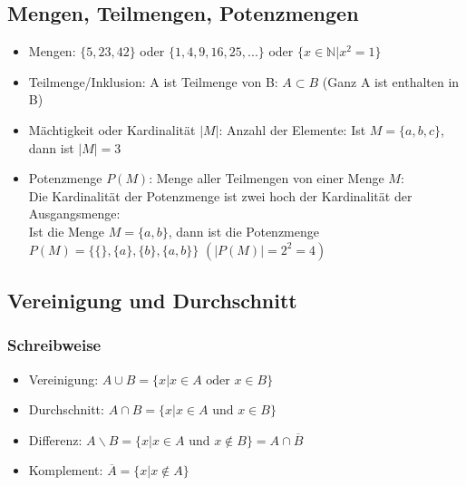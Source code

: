 \subsection{Mengen, Teilmengen, Potenzmengen}
\begin{itemize}
  \item Mengen: $\{5, 23, 42\}$ oder $\{1, 4, 9, 16, 25, ...\}$ oder
  $\{x \in \mathbb{N} | x^2 = 1 \}$
  \item Teilmenge/Inklusion: A ist Teilmenge von B: $A \subset B$ (Ganz A ist enthalten in B)
  \item Mächtigkeit oder Kardinalität $|M|$: Anzahl der Elemente: Ist $M = \{a, b, c\}$, dann ist $|M| = 3$
  \item Potenzmenge $P(M)$: Menge aller Teilmengen von einer Menge $M$:
  \\ Die Kardinalität der Potenzmenge ist zwei hoch der Kardinalität der Ausgangsmenge:
  \\ Ist die Menge $M = \{a, b\}$, dann ist die Potenzmenge $P(M) = \{\{\},
  \{a\}, \{b\}, \{a, b\}\}$ $(|P(M)| = 2^2 = 4)$

\end{itemize}

\subsection{Vereinigung und Durchschnitt}
\subsubsection{Schreibweise}
\begin{itemize}
  \item Vereinigung: $A \cup B = \{ x | x \in A \text{ oder } x \in B \}$
  \item Durchschnitt: $A \cap B = \{ x | x \in A \text{ und } x \in B \}$
  \item Differenz: $A \backslash B = \{ x | x \in A \text{ und } x
    \notin B \} = A \cap \overline B$
  \item Komplement: $\overline A = \{ x | x \notin A \}$
\end{itemize}

